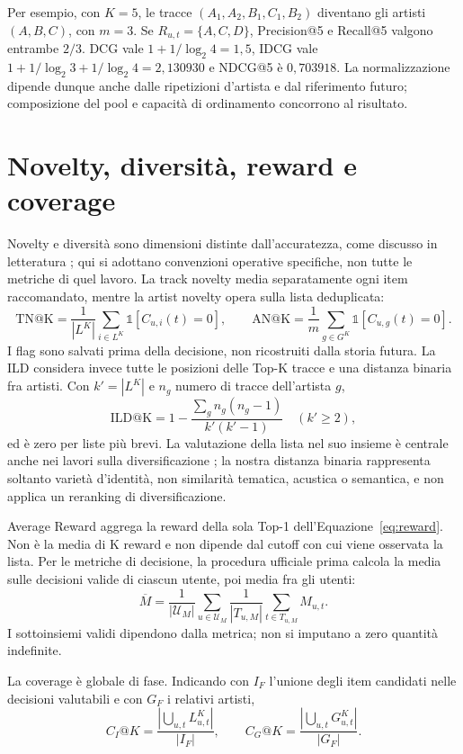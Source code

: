 Per esempio, con $K=5$, le tracce $(A_1,A_2,B_1,C_1,B_2)$ diventano gli artisti $(A,B,C)$, con $m=3$. Se $R_{u,t}=\{A,C,D\}$, Precision@5 e Recall@5 valgono entrambe $2/3$. DCG vale $1+1/\log_2 4=1{,}5$, IDCG vale $1+1/\log_2 3+1/\log_2 4=2{,}130930$ e NDCG@5 è $0{,}703918$. La normalizzazione dipende dunque anche dalle ripetizioni d'artista e dal riferimento futuro; composizione del pool e capacità di ordinamento concorrono al risultato.

\clearpage
\section{Novelty, diversità, reward e coverage}
Novelty e diversità sono dimensioni distinte dall'accuratezza, come discusso in letteratura \cite{vargas2011}; qui si adottano convenzioni operative specifiche, non tutte le metriche di quel lavoro. La track novelty media separatamente ogni item raccomandato, mentre la artist novelty opera sulla lista deduplicata:
\begin{equation}
\mathrm{TN@K}=\frac1{|L^K|}\sum_{i\in L^K}\mathbb1[C_{u,i}(t)=0],
\qquad
\mathrm{AN@K}=\frac1m\sum_{g\in G^K}\mathbb1[C_{u,g}(t)=0].
\end{equation}
I flag sono salvati prima della decisione, non ricostruiti dalla storia futura. La ILD considera invece tutte le posizioni delle Top-K tracce e una distanza binaria fra artisti. Con $k'=|L^K|$ e $n_g$ numero di tracce dell'artista $g$,
\begin{equation}
\mathrm{ILD@K}=1-\frac{\sum_g n_g(n_g-1)}{k'(k'-1)}\quad(k'\geq2),
\end{equation}
ed è zero per liste più brevi. La valutazione della lista nel suo insieme è centrale anche nei lavori sulla diversificazione \cite{ziegler2005}; la nostra distanza binaria rappresenta soltanto varietà d'identità, non similarità tematica, acustica o semantica, e non applica un reranking di diversificazione.

Average Reward aggrega la reward della sola Top-1 dell'Equazione~\ref{eq:reward}. Non è la media di K reward e non dipende dal cutoff con cui viene osservata la lista. Per le metriche di decisione, la procedura ufficiale prima calcola la media sulle decisioni valide di ciascun utente, poi media fra gli utenti:
\begin{equation}
\overline M=\frac1{|\mathcal U_M|}\sum_{u\in\mathcal U_M}
\frac1{|T_{u,M}|}\sum_{t\in T_{u,M}}M_{u,t}.\label{eq:macro}
\end{equation}
I sottoinsiemi validi dipendono dalla metrica; non si imputano a zero quantità indefinite.

La coverage è globale di fase. Indicando con $I_F$ l'unione degli item candidati nelle decisioni valutabili e con $G_F$ i relativi artisti,
\begin{equation}
C_I@K=\frac{|\bigcup_{u,t}L^K_{u,t}|}{|I_F|},\qquad
C_G@K=\frac{|\bigcup_{u,t}G^K_{u,t}|}{|G_F|}.
\end{equation}
\endgroup

